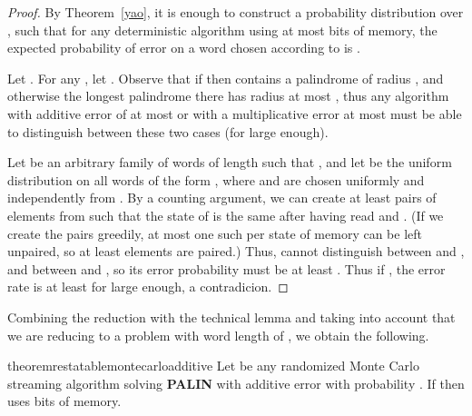 \documentclass{article}[11pt,letter]
\newcommand{\palin}[1][n]{{\bf PALIN}\xspace}
\begin{document}
\begin{proof}
By Theorem~\ref{yao}, it is enough to construct a probability distribution  over , such that for
any deterministic algorithm  using at most  bits of memory, the expected probability of error on a word chosen according
to  is .

Let .  For any , let .
Observe that if  then  contains a palindrome of radius , and otherwise the longest palindrome there has
radius at most , thus any algorithm with additive error of at most  or with a multiplicative error at most 
must be able to distinguish between these two cases (for  large enough).

Let  be an arbitrary family of words of length  such that , and let  be 
the uniform distribution on all words of the form , where  and  are chosen uniformly and independently from .
By a counting argument, we can create at least  pairs  of elements
from  such that the state of  is the same after having read  and . 
(If we create the pairs greedily, at most one such  per state of memory can be left unpaired, so at least  elements are paired.)
Thus,  cannot
distinguish between  and , and between  and , so its error probability must be at least
. Thus if , the error rate is at least  for  large enough, a contradicion.
\end{proof}

Combining the reduction with the technical lemma and 
taking into account that we are reducing to a problem with word length of ,
we obtain the following.

\begin{restatable}{theorem}{restatablemontecarloadditive}
\label{th:montecarlo_additive_lowerbound}
Let  be any randomized Monte Carlo streaming algorithm solving \palin with additive error 
with probability . If  then  uses
 bits of memory.
\end{restatable}
\end{document}
